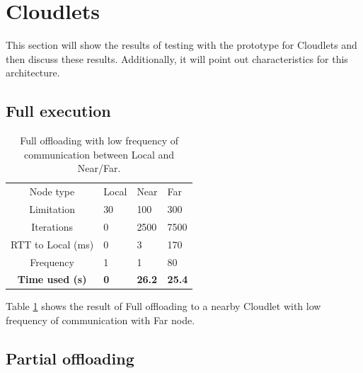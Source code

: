 

\section{Cloudlets}

This section will show the results of testing with the prototype for Cloudlets and then discuss these results. Additionally, it will point out characteristics for this architecture.


\subsection{Full execution}


\begin{table}[h!]
    \centering
    \begin{tabular}[c]{c|p{2cm}p{2cm}p{2cm}}

        Node type & Local & Near & Far \\

        Limitation          & 30 & 100 & 300  \\

        Iterations          & 0 & 2500 & 7500  \\

        RTT to Local (ms)   & 0 & 3 & 170 \\

        Frequency           & 1 & 1 & 80 \\

        \hline
        \textbf{Time used (s)}       & \textbf{0} & \textbf{26.2} & \textbf{25.4} \\

    \end{tabular}
    \caption{Full offloading with low frequency of communication between Local and Near/Far.}
    \label{tab:Cloudlet_full_offloading_low_frequency}
\end{table}

Table \ref{tab:Cloudlet_full_offloading_low_frequency} shows the result of Full offloading to a nearby Cloudlet with low frequency of communication with Far node.







\subsection{Partial offloading}



